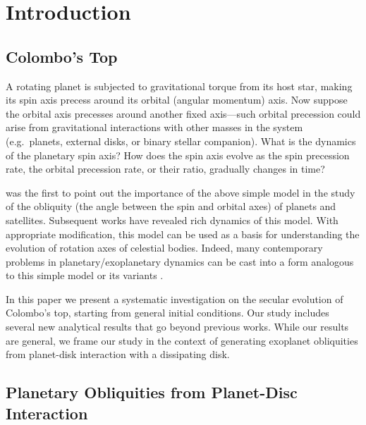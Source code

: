 
\section{Introduction}\label{s:intro}

\subsection{Colombo's Top}

A rotating planet is subjected to gravitational torque from its host star,
making its spin axis precess around its orbital (angular momentum) axis.  Now
suppose the orbital axis precesses around another fixed axis---such orbital
precession could arise from gravitational interactions with other masses in the
system (e.g.\ planets, external disks, or binary stellar companion). What is the
dynamics of the planetary spin axis?  How does the spin axis evolve as the spin
precession rate, the orbital precession rate, or their ratio, gradually changes
in time?

\citet{colombo1966} was the first to point out the importance of the above
simple model in the study of the obliquity (the angle between the spin and
orbital axes) of planets and satellites. Subsequent works
\citep{peale1969,peale1974possible,ward1975tidal,henrard1987} have revealed rich
dynamics of this model. With appropriate modification, this model can be used as
a basis for understanding the evolution of rotation axes of celestial bodies.
Indeed, many contemporary problems in planetary/exoplanetary dynamics can be
cast into a form analogous to this simple model or its variants
\citep[e.g.][]{ward2004I, fabrycky_otides, batygin2013magnetic, lai2014star,
anderson2018teeter,zanazzi2018planet}.

In this paper we present a systematic investigation on the secular evolution of
Colombo's top, starting from general initial conditions. Our study includes
several new analytical results that go beyond previous works. While our results
are general, we frame our study in the context of generating exoplanet
obliquities from planet-disk interaction with a dissipating disk.

\subsection{Planetary Obliquities from Planet-Disc Interaction}

